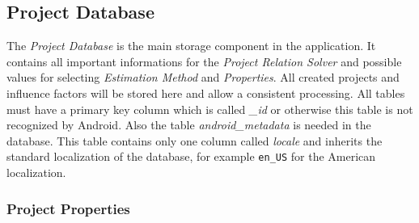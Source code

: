\subsection{Project Database}

The \textit{Project Database} is the main storage component in the application. It contains all important informations for the \textit{Project Relation Solver} and possible values for selecting \textit{Estimation Method} and \textit{Properties}. All created projects and influence factors will be stored here and allow a consistent processing. All tables must have a primary key column which is called \textit{\_id} or otherwise this table is not recognized by Android. Also the table \textit{android\_metadata} is needed in the database. This table contains only one column called \textit{locale} and inherits the standard localization of the database, for example \texttt{en\_US} for the American localization.\\

\subsubsection{Project Properties}\label{ProjectProperties}

